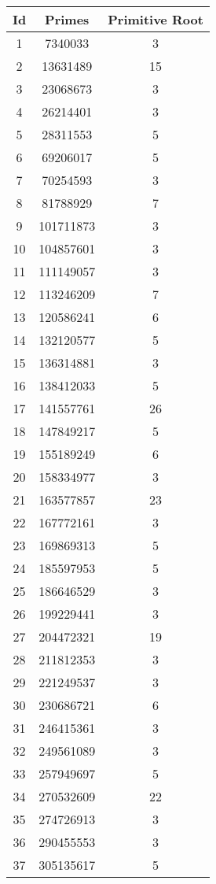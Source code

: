 \begin{spacing}{0.97}
\noindent \begin{tabular}{ccc}
\toprule
	   Id & Primes & Primitive Root\\
\midrule 1 & 7340033 & 3\\
 2 & 13631489 & 15\\
 3 & 23068673 & 3\\
 4 & 26214401 & 3\\
 5 & 28311553 & 5\\
 6 & 69206017 & 5\\
 7 & 70254593 & 3\\
 8 & 81788929 & 7\\
 9 & 101711873 & 3\\
 10 & 104857601 & 3\\
 11 & 111149057 & 3\\
 12 & 113246209 & 7\\
 13 & 120586241 & 6\\
 14 & 132120577 & 5\\
 15 & 136314881 & 3\\
 16 & 138412033 & 5\\
 17 & 141557761 & 26\\
 18 & 147849217 & 5\\
 19 & 155189249 & 6\\
 20 & 158334977 & 3\\
 21 & 163577857 & 23\\
 22 & 167772161 & 3\\
 23 & 169869313 & 5\\
 24 & 185597953 & 5\\
 25 & 186646529 & 3\\
 26 & 199229441 & 3\\
 27 & 204472321 & 19\\
 28 & 211812353 & 3\\
 29 & 221249537 & 3\\
 30 & 230686721 & 6\\
 31 & 246415361 & 3\\
 32 & 249561089 & 3\\
 33 & 257949697 & 5\\
 34 & 270532609 & 22\\
 35 & 274726913 & 3\\
 36 & 290455553 & 3\\
 37 & 305135617 & 5\\
\bottomrule
\end{tabular}

\end{spacing}

